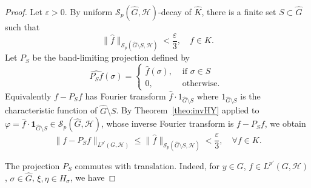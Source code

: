 \documentclass[11pt]{amsart}
\begin{document}
\begin{proof}
Let $\varepsilon>0$. By uniform $\mathscr{S}_p(\widehat{G},\mathcal{H})$-decay of
$\widehat K$, there is a finite set $S\subset\widehat{G}$ such that
$$
\|\widehat f\|_{\mathscr{S}_p(\widehat{G}\setminus S,\mathcal{H})}<\frac{\varepsilon}{3},\quad f\in K.
$$
Let $P_S$ be the band-limiting projection defined by
$$\widehat{P_Sf}(\sigma)=\left\lbrace\begin{array}{cc}
\widehat f(\sigma), & \text{ if } \sigma\in S\\ 
0, & \text{ otherwise. }
\end{array}\right.$$ 
 Equivalently $f-P_Sf$ has Fourier transform
$\widehat f\cdot 1_{\widehat{G}\setminus S}$ where $1_{\widehat{G}\setminus S}$ is the characteristic function of $\widehat{G}\setminus S$. By Theorem~\ref{theo:invHY} applied to $\varphi=\widehat f\cdot\mathbf1_{\widehat{G}\setminus S}
\in\mathscr{S}_p(\widehat{G},\mathcal{H})$, whose inverse Fourier transform is $f-P_Sf$, we obtain
\begin{equation}\label{RLL}
\|f-P_Sf\|_{L^{p'}(G,\mathcal{H})}\le\|\widehat f\|_{\mathscr{S}_p(\widehat{G}\setminus S,\mathcal{H})}<\frac{\varepsilon}{3},
\quad \forall f\in K. 
\end{equation}

The projection $P_S$ commutes with translation. Indeed, for $y\in G$, $f\in L^{p'}(G,\mathcal{H})$,
$\sigma\in\widehat{G}$, $\xi,\eta\in H_\sigma$,  we have


\end{proof}
\end{document}
